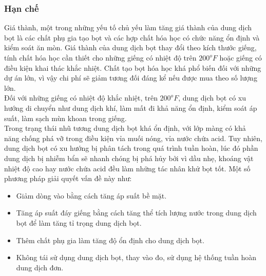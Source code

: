 \documentclass[12pt,a4paper]{article}
\begin{document}
\subsubsection{Hạn chế}
	Giá thành, một trong những yếu tố chủ yếu làm tăng giá thành của dung dịch bọt là các chất phụ gia tạo bọt và các hợp chất hóa học có chức năng ổn định và kiểm soát ăn mòn. Giá thành của dung dịch bọt thay đổi theo kích thước giếng, tính chất hóa học cần thiết cho những giếng có nhiệt độ trên $200^oF$ hoặc giếng có điều kiện khai thác khắc nhiệt. Chất tạo bọt hóa học khá phổ biến đối với những dự án lớn, vì vậy chi phí sẽ giảm tương đối đáng kể nếu được mua theo số lượng lớn.\\
	Đối với những giếng có nhiệt độ khắc nhiệt, trên $200^oF$, dung dịch bọt có xu hướng di chuyển như dung dịch khí, làm mất đi khả năng ổn định, kiểm soát áp suất, làm sạch mùn khoan trong giếng.\\
	Trong trạng thái nhũ tương dung dịch bọt khá ổn định, với lớp màng có khả năng chống phá vỡ trong điều kiện vỉa muối nóng, vỉa nước chứa acid. Tuy nhiên, dung dịch bọt có xu hướng bị phân tách trong quá trình tuần hoàn, lúc đó phần dung dịch bị nhiễm bẩn sẽ nhanh chóng bị phá hủy bởi vì dầu nhẹ, khoáng vật nhiệt độ cao hay nước chứa acid đều làm những tác nhân khử bọt tốt. Một số phương pháp giải quyết vấn đề này như:
	\begin{itemize}
		\item Giảm dòng vào bằng cách tăng áp suất bề mặt.
		\item Tăng áp suất đáy giếng bằng cách tăng thể tích lượng nước trong dung  dịch bọt để làm tăng tỉ trọng dung dịch bọt.
		\item Thêm chất phụ gia làm tăng độ ổn định cho dung dịch bọt.
		\item Không tái sử dụng dung dịch bọt, thay vào đo, sử dụng hệ thống tuần hoàn dung dịch đơn.
	\end{itemize}
\end{document}
